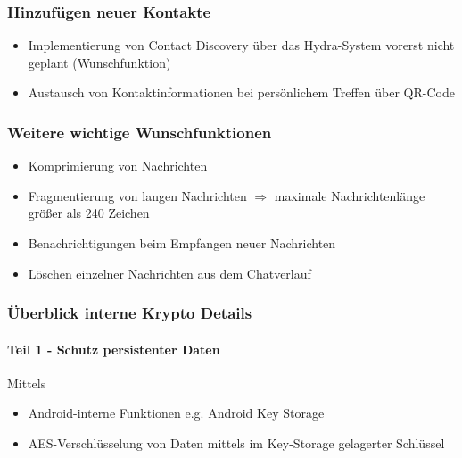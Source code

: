 \documentclass[t]{beamer}
\begin{document}
   \begin{frame}
   		\frametitle{Hinzufügen neuer Kontakte}
        \pause
   		\begin{itemize}
            \item
                Implementierung von Contact Discovery über das Hydra-System vorerst nicht geplant (Wunschfunktion)
                \pause

   			\item
                Austausch von Kontaktinformationen bei persönlichem Treffen über QR-Code
   		\end{itemize}
   \end{frame}

   \begin{frame}
   		\frametitle{Weitere wichtige Wunschfunktionen}
        \pause
   		\begin{itemize}
            \item
                Komprimierung von Nachrichten
                \pause
   			\item Fragmentierung von langen Nachrichten
                $\Rightarrow$ maximale Nachrichtenlänge größer als 240 Zeichen
   			\pause
   			\item Benachrichtigungen beim Empfangen neuer Nachrichten
                \pause
            \item
                Löschen einzelner Nachrichten aus dem Chatverlauf
   		\end{itemize}
    \end{frame}

    \begin{frame}
		\frametitle{Überblick interne Krypto Details}
        \pause
		
		\framesubtitle{Teil 1 - Schutz persistenter Daten}
		Mittels
		\begin{itemize}
			\item Android-interne Funktionen e.g. Android Key Storage
			\pause
			\item AES-Verschlüsselung von Daten mittels im Key-Storage
			gelagerter Schlüssel
		\end{itemize}
	\end{frame}
\end{document}
